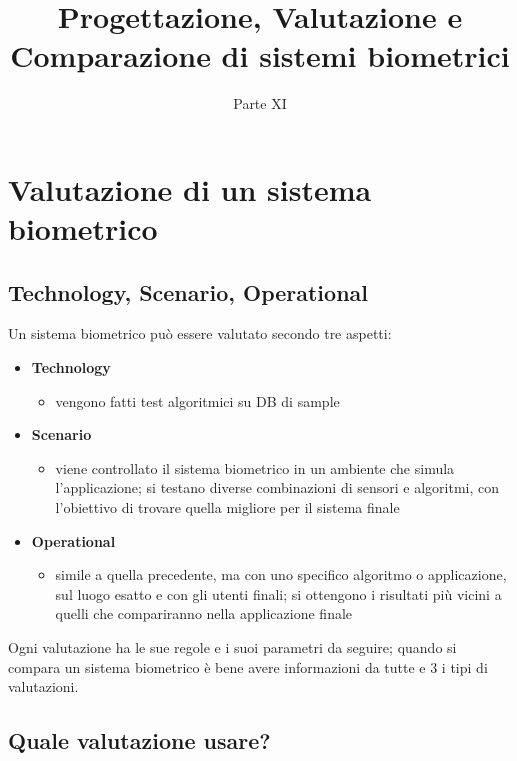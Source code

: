\documentclass{report}
\title{Progettazione, Valutazione e Comparazione di sistemi biometrici}
\date{Parte XI}
\begin{document}
\maketitle

\tableofcontents
\newpage

\chapter{Valutazione di un sistema biometrico}

\section{Technology, Scenario, Operational}

Un sistema biometrico può essere valutato secondo 
tre aspetti:
\begin{itemize}
    \item \textbf{Technology}
    \begin{itemize}
        \item vengono fatti test algoritmici su DB di sample
    \end{itemize}
    \item \textbf{Scenario}
    \begin{itemize}
        \item viene controllato il sistema biometrico in un ambiente che 
        simula l'applicazione; si testano diverse combinazioni di 
        sensori e algoritmi, con l'obiettivo di trovare quella migliore 
        per il sistema finale
    \end{itemize} 
    \item \textbf{Operational}
    \begin{itemize}
        \item simile a quella precedente, ma con uno specifico algoritmo 
        o applicazione, sul luogo esatto e con gli utenti finali; si ottengono i risultati più vicini a quelli che compariranno nella applicazione finale
    \end{itemize}
\end{itemize}

\noindent Ogni valutazione ha le sue regole e i suoi parametri da 
seguire; quando si compara un sistema biometrico è bene avere 
informazioni da tutte e 3 i tipi di valutazioni.

\section{Quale valutazione usare?}
\end{document}
